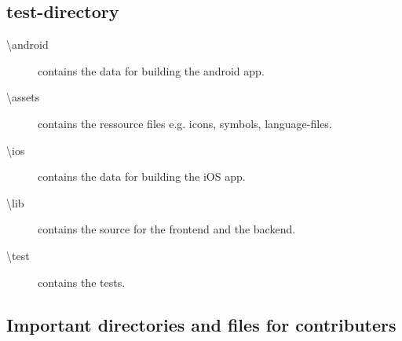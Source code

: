 \subsection{test-directory}
\label{fig: structure-tests}

\begin{description}
    \item[\textbackslash android] contains the data for building the android app.
    \item[\textbackslash assets] contains the ressource files e.g. icons, symbols, language-files.
    \item[\textbackslash ios] contains the data for building the iOS app.
    \item[\textbackslash lib] contains the source for the frontend and the backend.
    \item[\textbackslash test] contains the tests.
\end{description}

\subsection{Important directories and files for contributers}

